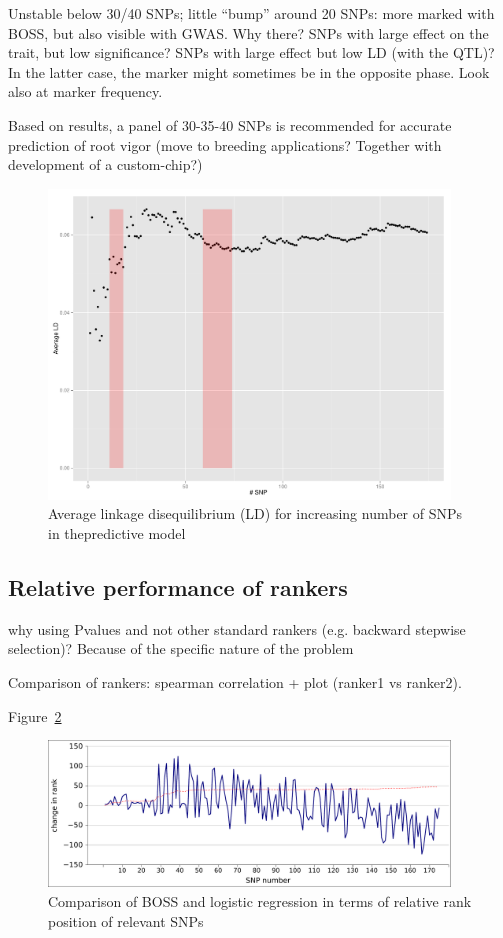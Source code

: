 Unstable below 30/40 SNPs; little ``bump'' around 20 SNPs: more marked
with BOSS, but also visible with GWAS. Why there? SNPs with large effect
on the trait, but low significance? SNPs with large effect but low LD
(with the QTL)? In the latter case, the marker might sometimes be in the
opposite phase. Look also at marker frequency.

Based on results, a panel of 30-35-40 SNPs is recommended for accurate
prediction of root vigor (move to breeding applications? Together with
development of a custom-chip?)

\begin{figure}
\includegraphics[width=0.95\textwidth]{LD.pdf}
\caption{Average linkage disequilibrium (LD) for increasing number of
  SNPs in thepredictive model}
\label{fig:ld} 
\end{figure}

\subsection{Relative performance of rankers}
why using Pvalues and not other standard rankers (e.g. backward stepwise
selection)? Because of the specific nature of the problem

Comparison of rankers: spearman correlation + plot (ranker1 vs ranker2).

Figure~\ref{fig:rank}

\begin{figure}
\includegraphics[width=0.95\textwidth]{rank.pdf}
\caption{Comparison of BOSS and logistic regression in terms of relative
rank position of relevant SNPs}
\label{fig:rank} 
\end{figure}


